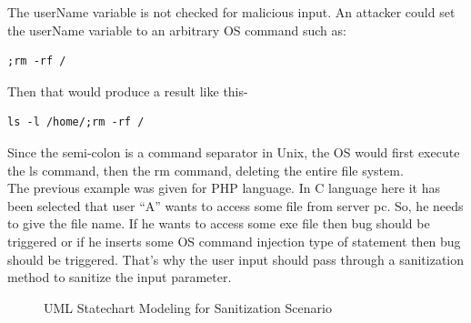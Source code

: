 The userName variable is not checked for malicious input. An attacker could set the userName variable to an arbitrary OS command such as:
\begin{lstlisting}
;rm -rf /
\end{lstlisting}
Then that would produce a result like this-
\begin{lstlisting}
ls -l /home/;rm -rf /
\end{lstlisting}
Since the semi-colon is a command separator in Unix, the OS would first execute the ls command, then the rm command, deleting the entire file system.\\

The previous example was given for PHP language. In C language here it has been selected that user \enquote{A} wants to access some file from server pc. So, he needs to give the file name. If he wants to access some exe file then bug should be triggered or if he inserts some OS command injection type of statement then bug should be triggered. That's why the user input should pass through a sanitization method to sanitize the input parameter.\\

\begin{figure}[htbp]
	\centering
	\label{sanitization_scenario}
	\caption{UML Statechart Modeling for Sanitization Scenario}
\end{figure}

